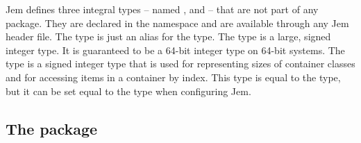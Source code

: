 \documentclass[a4paper,10pt]{article}
\begin{document}
Jem defines three integral types -- named ,  and
 -- that are not part of any package. They are declared in
the namespace  and are available through any Jem header file.
The  type is just an alias for the  type.
The  type is a large, signed integer type. It is guaranteed to
be a 64-bit integer type on 64-bit systems. The  type is a
signed integer type that is used for representing sizes of container
classes and for accessing items in a container by index. This type is
equal to the  type, but it can be set equal to the 
type when configuring Jem.

\subsection{The  package}
\end{document}
